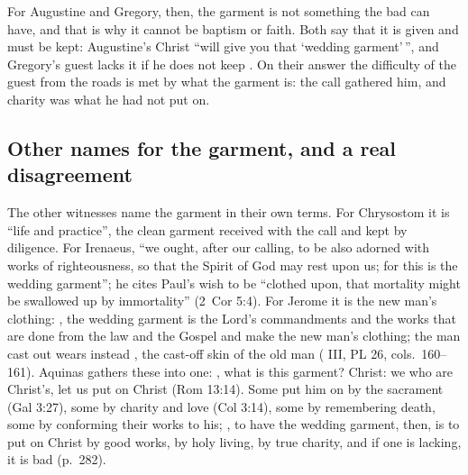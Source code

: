 For Augustine and Gregory, then, the garment is not something the bad can
have, and that is why it cannot be baptism or faith. Both say that it is given
and must be kept: Augustine's Christ ``will give you that `wedding garment'\,'',
and Gregory's guest lacks it if he does not keep .
On their answer the difficulty of the guest from the roads is met by what the
garment is: the call gathered him, and charity was what he had not put on.

\subsection{Other names for the garment, and a real disagreement}

The other witnesses name the garment in their own terms. For Chrysostom it is
``life and practice'', the clean garment received with the call and kept by
diligence. For Irenaeus, ``we ought, after our calling, to be also adorned with
works of righteousness, so that the Spirit of God may rest upon us; for this is
the wedding garment''; he cites Paul's wish to be ``clothed upon, that
mortality might be swallowed up by immortality'' (2~Cor 5:4). For Jerome it is
the new man's clothing: , the wedding garment is the Lord's commandments and the works that
are done from the law and the Gospel and make the new man's clothing; the man
cast out wears instead , the cast-off skin of the
old man ( III, PL 26, cols.~160--161). Aquinas
gathers these into one: , what is this garment? Christ: we who are Christ's,
let us put on Christ (Rom 13:14). Some put him on by the sacrament (Gal 3:27),
some by charity and love (Col 3:14), some by remembering death, some by
conforming their works to his; , to have the wedding garment, then, is to
put on Christ by good works, by holy living, by true charity, and if one is
lacking, it is bad (p.~282).

